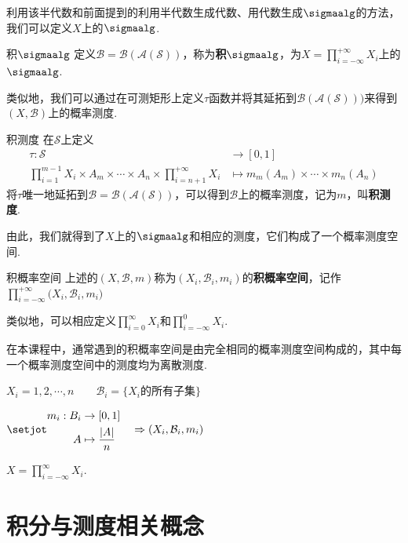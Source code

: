 利用该半代数和前面提到的利用半代数生成代数、用代数生成$\sigmaalg$的方法，我们可以定义$X$上的$\sigmaalg$.
\begin{definition}{积$\sigmaalg$}\label{def:1.11}
        定义$\mathcal{B}= \mathcal{B}(\mathcal{A}(\mathcal{S}))$，称为\textbf{积$\sigmaalg$}，为$X=\prod_{i=-\infty}^{+\infty}{X_i}$上的$\sigmaalg$.
\end{definition}
类似地，我们可以通过在可测矩形上定义$\tau$函数并将其延拓到$\mathcal{B}(\mathcal{A}(\mathcal{S})))$来得到$(X,\mathcal{B})$上的概率测度.
\begin{definition}{积测度}\label{def:1.12}
    在$\mathcal{S}$上定义
    \begin{align*}
        \tau:\mathcal{S}&\to[0,1] \\
        \prod_{i=1}^{m-1}{X_i} \times A_m \times \cdots \times A_n \times \prod_{i=n+1}^{+\infty}{X_i} &\mapsto m_m(A_m) \times \cdots \times m_n(A_n)
    \end{align*}
    将$\tau$唯一地延拓到$\mathcal{B}=\mathcal{B}(\mathcal{A}(\mathcal{S}))$，可以得到$\mathcal{B}$上的概率测度，记为$m$，叫\textbf{积测度}.
\end{definition}
由此，我们就得到了$X$上的$\sigmaalg$和相应的测度，它们构成了一个概率测度空间.
\begin{definition}{积概率空间}
    上述的$(X,\mathcal{B},m)$称为$(X_i,\mathcal{B}_i,m_i)$的\textbf{积概率空间}，记作$\prod_{i=-\infty}^{+\infty}{(X_i,\mathcal{B}_i,m_i})$
\end{definition}
类似地，可以相应定义$\prod_{i=0}^\infty{X_i}$和$\prod_{i=-\infty}^0{X_i}$.\par
在本课程中，通常遇到的积概率空间是由完全相同的概率测度空间构成的，其中每一个概率测度空间中的测度均为离散测度.\par
\vspace{2 em}
\begin{instance}
    $X_i={1,2,\cdots,n}\qquad \mathcal{B}_i=\{ X_i\text{的所有子集}\}$\par
    $\setjot\begin{aligned}
        m_i:B_i&\to[0,1] \\
        A&\mapsto\frac{|A|}{n}
    \end{aligned} \quad \Rightarrow(X_i,\mathcal{B}_i,m_i)$\par
    $X=\prod_{i=-\infty}^\infty{X_i}$.
\end{instance}


\section{积分与测度相关概念}

